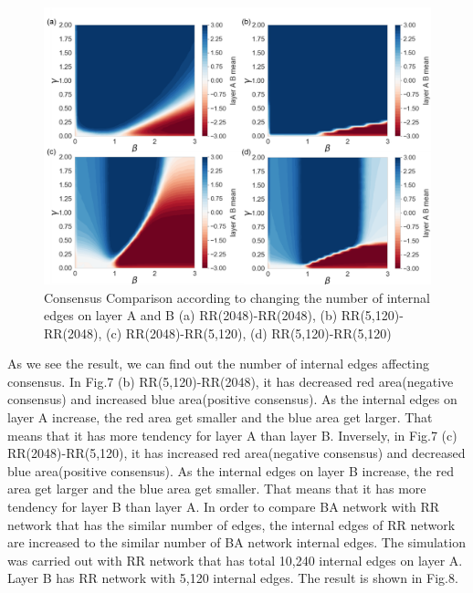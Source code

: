 \documentclass[english]{cccconf}
\begin{document}
\begin{figure}[!htb]
  \centering
  \includegraphics[width=\hsize]{FIG7.png}
  \caption{Consensus Comparison according to changing the number of internal edges on layer A and B (a) RR(2048)-RR(2048), (b) RR(5,120)-RR(2048), (c) RR(2048)-RR(5,120), (d) RR(5,120)-RR(5,120)}
  \label{Fig7}
\end{figure}
As we see the result, we can find out the number of internal edges affecting consensus. In Fig.7 (b) RR(5,120)-RR(2048), it has decreased red area(negative consensus) and increased blue area(positive consensus). As the internal edges on layer A increase, the red area get smaller and the blue area get larger. That means that it has more tendency for layer A than layer B. 
Inversely, in Fig.7 (c) RR(2048)-RR(5,120), it has increased red area(negative consensus) and decreased blue area(positive consensus). As the internal edges on layer B increase, the red area get larger and the blue area get smaller. That means that it has more tendency for layer B than layer A.
In order to compare BA network with RR network that has the similar number of edges, the internal edges of RR network are increased to the similar number of BA network internal edges. The simulation was carried out with RR network that has total 10,240 internal edges on layer A. Layer B has RR network with 5,120 internal edges. The result is shown in Fig.8.
\end{document}
